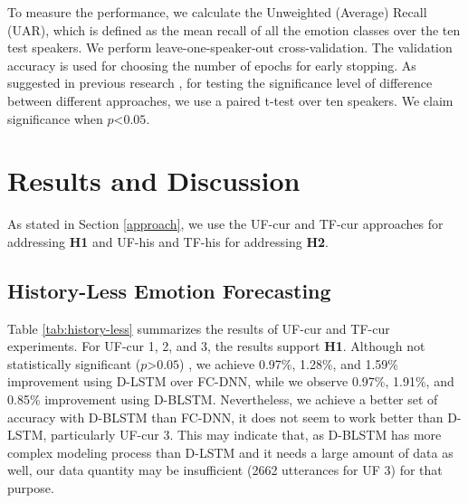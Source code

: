 To measure the performance, we calculate the Unweighted (Average) Recall (UAR), which is defined as the mean recall of all the emotion classes over the ten test speakers. We perform leave-one-speaker-out cross-validation. The validation accuracy is used for choosing the number of epochs for early stopping. As suggested in previous research \cite{significance} , for testing the significance level of difference between different approaches, we use a paired t-test over ten speakers. We claim significance when $p$\textless$0.05$.


\newpage
\chapter{Results and Discussion}
\label{result_and_discuss}

As stated in Section \ref{approach}, we  use the UF-cur and TF-cur approaches for addressing \textbf{H1} and UF-his and TF-his for addressing \textbf{H2}. 


\section{History-Less Emotion Forecasting}

Table \ref{tab:history-less} summarizes the results of UF-cur and TF-cur experiments. For UF-cur 1, 2, and 3, the results support  \textbf{H1}. Although not statistically significant ($p$\textgreater$0.05$) , we achieve 0.97\%, 1.28\%, and 1.59\% improvement using D-LSTM over FC-DNN, while we observe  0.97\%, 1.91\%, and 0.85\% improvement using D-BLSTM. Nevertheless, we achieve a better set of accuracy with D-BLSTM than FC-DNN, it does not seem to work better than D-LSTM, particularly UF-cur 3. This may indicate that, as D-BLSTM has more complex modeling process than D-LSTM and it needs a large amount of data as well, our data quantity may be insufficient (2662 utterances for UF 3) for that purpose.


